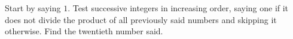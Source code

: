 Start by saying $1$. Test successive integers in increasing order, saying one if it does not divide the product of all previously said numbers and skipping it otherwise. Find the twentieth number said.
